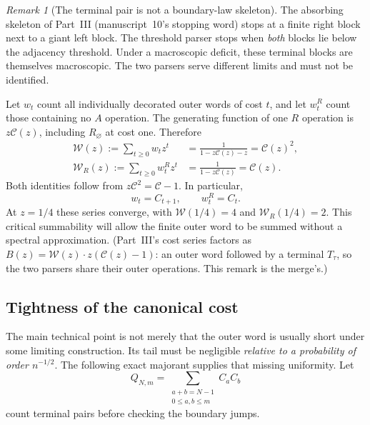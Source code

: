 \documentclass[11pt,a4paper]{article}
\theoremstyle{definition}\newaliascnt{definition}{theorem}
\theoremstyle{remark}\newaliascnt{remark}{theorem}
\newtheorem{remark}[remark]{Remark}
\newcommand{\Cat}{\mathcal C}
\begin{document}
\begin{remark}[The terminal pair is not a boundary-law skeleton]
The absorbing skeleton of Part~III (manuscript~10's stopping word) stops at a
finite right block next to a giant left block. The threshold parser stops
when \emph{both} blocks lie below the adjacency threshold. Under a
macroscopic deficit, these terminal blocks are themselves macroscopic. The
two parsers serve different limits and must not be identified.
\end{remark}

Let $w_t$ count all individually decorated outer words of cost $t$, and let
$w^R_t$ count those containing no $A$ operation. The generating function of
one $R$ operation is $z\Cat(z)$, including $R_\varnothing$ at cost one.
Therefore
\begin{align}
 \mathcal W(z):=\sum_{t\ge0}w_tz^t
    &=\frac{1}{1-z\Cat(z)-z}=\Cat(z)^2,
 \label{mj:eq:W}\\
 \mathcal W_R(z):=\sum_{t\ge0}w^R_tz^t
    &=\frac{1}{1-z\Cat(z)}=\Cat(z).
 \label{mj:eq:WR}
\end{align}
Both identities follow from $z\Cat^2=\Cat-1$. In particular,
\begin{equation}
 w_t=C_{t+1},\qquad w^R_t=C_t.
 \label{mj:eq:word-counts}
\end{equation}
At $z=1/4$ these series converge, with $\mathcal W(1/4)=4$ and
$\mathcal W_R(1/4)=2$. This critical summability will allow the finite outer
word to be summed without a spectral approximation. (Part~III's cost series
factors as $B(z)=\mathcal W(z)\cdot z(\Cat(z)-1)$: an outer word followed by
a terminal $T_\tau$, so the two parsers share their
outer operations. This remark is the merge's.)

\subsection{Tightness of the canonical cost}
\label{mj:sec:tightness}
The main technical point is not merely that the outer word is usually short
under some limiting construction. Its tail must be negligible
\emph{relative to a probability of order $n^{-1/2}$}. The following exact
majorant supplies that missing uniformity. Let
\begin{equation}
 Q_{N,m}=\sum_{\substack{a+b=N-1\\0\le a,b\le m}}C_aC_b
 \label{mj:eq:Q}
\end{equation}
count terminal pairs before checking the boundary jumps.
\end{document}
